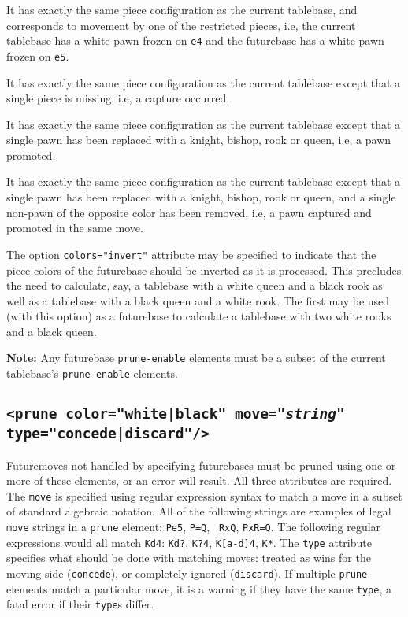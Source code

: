 \documentclass[11pt]{article}
\begin{document}
\begin{description}
\item It has exactly the same piece configuration as the
current tablebase, and corresponds to movement by one of the
restricted pieces, i.e, the current tablebase has a white pawn frozen
on {\tt e4} and the futurebase has a white pawn frozen on {\tt e5}.

\item It has exactly the same piece configuration as
the current tablebase except that a single piece is missing, i.e,
a capture occurred.

\item It has exactly the same piece configuration as the current
tablebase except that a single pawn has been replaced with a knight,
bishop, rook or queen, i.e, a pawn promoted.

\item It has exactly the same piece configuration as the current
tablebase except that a single pawn has been replaced with a knight,
bishop, rook or queen, and a single non-pawn of the opposite color has
been removed, i.e, a pawn captured and promoted in the same move.

\end{description}

The option {\tt colors="invert"} attribute may be specified to indicate
that the piece colors of the futurebase should be inverted as it is
processed.  This precludes the need to calculate, say, a tablebase
with a white queen and a black rook as well as a tablebase with a
black queen and a white rook.  The first may be used (with this
option) as a futurebase to calculate a tablebase with two white rooks
and a black queen.

{\bf Note:} Any futurebase {\tt prune-enable} elements must be a subset of
the current tablebase's {\tt prune-enable} elements.

\subsection{\tt <prune color="white|black" move="{\it string}" type="concede|discard"/>}

Futuremoves not handled by specifying futurebases must be pruned using
one or more of these elements, or an error will result.  All three
attributes are required.  The {\tt move} is specified using regular
expression syntax to match a move in a subset of standard algebraic
notation.  All of the following strings are examples of legal {\tt
move} strings in a {\tt prune} element: {\tt Pe5}, {\tt P=Q}, {\tt
RxQ}, {\tt PxR=Q}.  The following regular expressions would all match
{\tt Kd4}: {\tt Kd?}, {\tt K?4}, {\tt K[a-d]4}, {\tt K*}.
The {\tt type} attribute specifies what should be done with matching
moves: treated as wins for the moving side ({\tt concede}), or
completely ignored ({\tt discard}).  If multiple {\tt prune}
elements match a particular move, it is a warning if they have the
same {\tt type}, a fatal error if their {\tt type}s differ.
\end{document}
